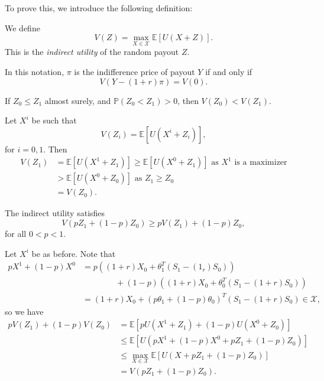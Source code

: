 \documentclass[12pt]{article}
\begin{document}

To prove this, we introduce the following definition:
\begin{definition}
	We define
	\[
	V(Z) = \max_{X \in \mathcal{X}} \mathbb{E}[U(X+Z)].
	\]
	This is the \emph{indirect utility} of the random payout $Z$.
\end{definition}

In this notation, $\pi$ is the indifference price of payout $Y$ if and only if
\[
V(Y - (1 + r)\pi) = V(0).
\]

\begin{lemma}
	If $Z_0 \leq Z_1$ almost surely, and $\mathbb{P}(Z_0 < Z_1) > 0$, then $V(Z_0) < V(Z_1)$.
\end{lemma}

\begin{proofbox}
	Let $X^i$ be such that
	\[
	V(Z_i) = \mathbb{E}[U(X^i + Z_i)],
	\]
	for $i = 0, 1$. Then
	\begin{align*}
		V(Z_1) &= \mathbb{E}[U(X^1 + Z_1)] \geq \mathbb{E}[U(X^0 + Z_1)] \text{ as $X^1$ is a maximizer}\\
		       &> \mathbb{E}[U(X^0 + Z_0)] \text{ as  } Z_1 \geq Z_0 \\
		       &= V(Z_0).
	\end{align*}
\end{proofbox}

\begin{lemma}
	The indirect utility satisfies
	\[
	V(pZ_1 + (1-p)Z_0) \geq p V(Z_1) + (1-p)Z_0,
	\]
	for all $0 < p < 1$.
\end{lemma}

\begin{proofbox}
	Let $X^i$ be as before. Note that
	\begin{align*}
		p X^1 + (1-p) X^0 &= p((1 + r)X_0 + \theta_1^{T}(S_1 - (1_r)S_0)) \\
				  &\qquad\qquad+ (1-p)((1+r)X_0 + \theta_0^{T}(S_1 - (1+r)S_0)) \\
		&= (1+r)X_0 + (p \theta_1 + (1-p)\theta_0)^{T}(S_1 - (1+r)S_0) \in \mathcal{X},
	\end{align*}
	so we have
	\begin{align*}
		p V(Z_1) + (1-p) V(Z_0) &= \mathbb{E}[p U(X^1 + Z_1) + (1-p)U(X^0 + Z_0)] \\
					&\leq \mathbb{E}[U(pX^1 + (1-p)X^0 + p Z_1 + (1-p) Z_0)] \\
					&\leq \max_{X \in \mathcal{X}} \mathbb{E}[U(X + p Z_1 + (1-p) Z_0)] \\
					&= V(pZ_1 + (1-p)Z_0).
	\end{align*}
\end{proofbox}
\end{document}

